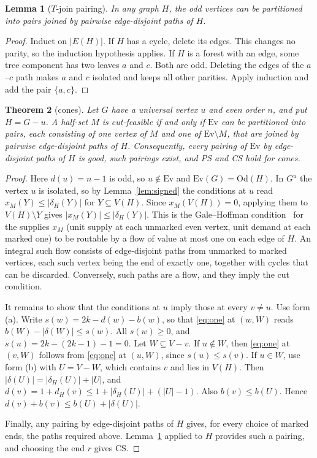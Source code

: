 \documentclass[11pt]{amsart}
\newtheorem{theorem}{Theorem}
\newtheorem{lemma}[theorem]{Lemma}
\theoremstyle{definition}
\newcommand{\Ev}{\mathrm{Ev}}
\newcommand{\Od}{\mathrm{Od}}
\begin{document}
\begin{lemma}[$T$-join pairing]\label{lem:tjoin}
In any graph $H$, the odd vertices can be partitioned into pairs joined by pairwise edge-disjoint paths
of $H$.
\end{lemma}

\begin{proof}
Induct on $|E(H)|$. If $H$ has a cycle, delete its edges. This changes no parity, so the induction
hypothesis applies. If $H$ is a forest with an edge, some tree component has two leaves $a$ and $c$.
Both are odd. Deleting the edges of the $a$--$c$ path makes $a$ and $c$ isolated and keeps all other
parities. Apply induction and add the pair $\{a,c\}$.
\end{proof}

\begin{theorem}[cones]\label{thm:cone}
Let $G$ have a universal vertex $u$ and even order $n$, and put $H=G-u$. A half-set $M$ is
cut-feasible if and only if $\Ev$ can be partitioned into pairs, each consisting of one vertex of $M$
and one of $\Ev\setminus M$, that are joined by pairwise edge-disjoint paths of $H$. Consequently,
every pairing of $\Ev$ by edge-disjoint paths of $H$ is good, such pairings exist, and PS and CS hold
for cones.
\end{theorem}

\begin{proof}
Here $d(u)=n-1$ is odd, so $u\notin\Ev$ and $\Ev(G)=\Od(H)$. In $G^u$ the vertex $u$ is isolated, so
by Lemma~\ref{lem:signed} the conditions at $u$ read $x_M(Y)\le|\delta_H(Y)|$ for $Y\subseteq V(H)$.
Since $x_M(V(H))=0$, applying them to $V(H)\setminus Y$ gives $|x_M(Y)|\le|\delta_H(Y)|$. This is the
Gale--Hoffman condition~\cite{Gale57,Hof60} for the supplies $x_M$ (unit supply at each unmarked even
vertex, unit demand at each marked one) to be routable by a flow of value at most one on each edge of
$H$. An integral such flow consists of edge-disjoint paths from unmarked to marked vertices, each such
vertex being the end of exactly one, together with cycles that can be discarded. Conversely, such
paths are a flow, and they imply the cut condition.

It remains to show that the conditions at $u$ imply those at every $v\neq u$. Use form (a). Write
$s(w)=2k-d(w)-b(w)$, so that \eqref{eq:one} at $(w,W)$ reads $b(W)-|\delta(W)|\le s(w)$. All
$s(w)\ge 0$, and $s(u)=2k-(2k-1)-1=0$. Let $W\subseteq V-v$. If $u\notin W$, then \eqref{eq:one} at
$(v,W)$ follows from \eqref{eq:one} at $(u,W)$, since $s(u)\le s(v)$. If $u\in W$, use form (b) with
$U=V-W$, which contains $v$ and lies in $V(H)$. Then $|\delta(U)|=|\delta_H(U)|+|U|$, and
$d(v)=1+d_H(v)\le 1+|\delta_H(U)|+(|U|-1)$. Also $b(v)\le b(U)$. Hence
$d(v)+b(v)\le b(U)+|\delta(U)|$.

Finally, any pairing by edge-disjoint paths of $H$ gives, for every choice of marked ends, the paths
required above. Lemma~\ref{lem:tjoin} applied to $H$ provides such a pairing, and choosing the end $r$
gives CS.
\end{proof}
\end{document}
